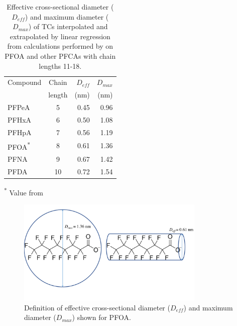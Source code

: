 \begin{table}
\caption{Effective cross-sectional diameter ($D_{eff}$) and maximum diameter ($D_{max}$) of TCs interpolated and extrapolated by linear regression from calculations performed by \cite{inoue2012size} on PFOA and other PFCAs with chain lengths 11-18.}
\centering
\begin{threeparttable}
\label{tab:molecsize}
\begin{tabular}{lcrr}
\toprule
Compound & Chain & $D_{eff}$ & $D_{max}$ \\ 
& length & (nm) & (nm) \\ \midrule
PFPeA & 5  & 0.45  & 0.96  \\
PFHxA & 6  & 0.50  & 1.08  \\
PFHpA & 7  & 0.56  & 1.19  \\
PFOA\textsuperscript{*} & 8 & 0.61 & 1.36 \\
PFNA & 9 & 0.67 & 1.42  \\
PFDA & 10 & 0.72 & 1.54  \\ \bottomrule                                    
\end{tabular}
\begin{tablenotes}
\item \textsuperscript{*} Value from \cite{inoue2012size}
\end{tablenotes}
\end{threeparttable}
\end{table}

\begin{figure}
    \centering
    \includegraphics[width=0.8\textwidth, trim={0 2cm 0 0},clip]{Diagrams/Molecular_size.pdf}
    \caption{Definition of effective cross-sectional diameter ($D_{eff}$) and maximum diameter ($D_{max}$) shown for PFOA.}
    \label{fig:molecularSize}
\end{figure}

